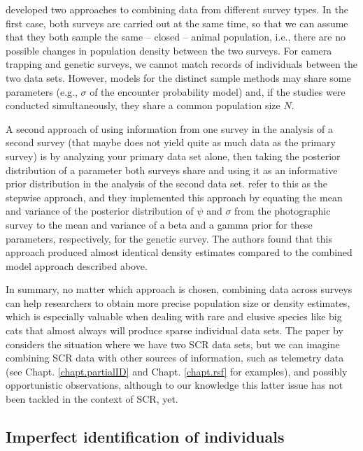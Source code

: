 \citet{gopalaswamy_etal:2012mee} developed two approaches to combining
data from different survey types. In the first case, both surveys are
carried out at the same time, so that we can assume that they both
sample the same -- closed -- animal population, i.e., there are no
possible changes in population density between the two surveys. For
camera trapping and genetic surveys, we cannot match records of
individuals between the two data sets. However, models for the
distinct sample methods may share some parameters (e.g., $\sigma$ of
the encounter probability model) and, if the studies were conducted
simultaneously, they share a common population size $N$.

A second approach of using information from one survey in the analysis
of a second survey (that maybe does not yield quite as much data as
the primary survey) is by analyzing your primary data set alone, then
taking the posterior distribution of a parameter both surveys share
and using it as an informative prior distribution in the analysis of
the second data set. \citet{gopalaswamy_etal:2012mee} refer to this as
the stepwise approach, and they implemented this approach by equating
the mean and variance of the posterior distribution of $\psi$ and
$\sigma$ from the photographic survey to the mean and variance of a
beta and a gamma prior for these parameters, respectively, for the
genetic survey. The authors found that this approach produced almost
identical density estimates compared to the combined model approach
described above.

In summary, no matter which approach is chosen, combining data across
surveys can help researchers to obtain more precise population size or
density
estimates, which is especially valuable when dealing with rare and
elusive species like big cats that almost always will produce sparse
individual data sets. 
The paper by \citet{gopalaswamy_etal:2012mee} considers the
situation where we have two SCR data sets, but we can imagine
combining SCR data with other sources of information, such as
telemetry data (see Chapt. \ref{chapt.partialID} and
Chapt. \ref{chapt.rsf} for examples), and possibly opportunistic
observations, although to our knowledge this latter issue has not been
tackled in the context of SCR, yet.


\subsection{Imperfect identification of individuals}

